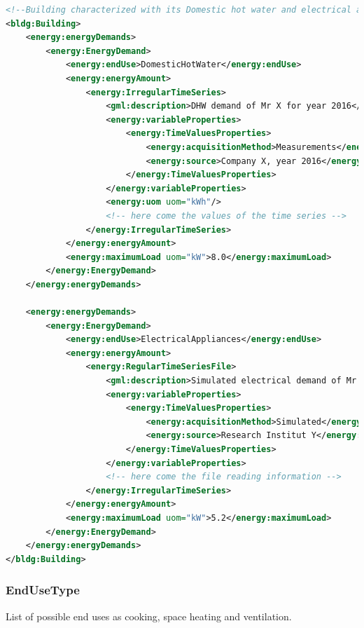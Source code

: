 \documentclass[a4paper,12pt]{article}
\begin{document}
\begin{lstlisting}[language=XML]
<!--Building characterized with its Domestic hot water and electrical appliances demands-->
<bldg:Building>
    <energy:energyDemands>
        <energy:EnergyDemand>
            <energy:endUse>DomesticHotWater</energy:endUse>
            <energy:energyAmount>
                <energy:IrregularTimeSeries>
                    <gml:description>DHW demand of Mr X for year 2016</gml:description>
                    <energy:variableProperties>
                        <energy:TimeValuesProperties>
                            <energy:acquisitionMethod>Measurements</energy:acquisitionMethod>
                            <energy:source>Company X, year 2016</energy:source>
                        </energy:TimeValuesProperties>
                    </energy:variableProperties>
                    <energy:uom uom="kWh"/>
                    <!-- here come the values of the time series -->
                </energy:IrregularTimeSeries>
            </energy:energyAmount>
            <energy:maximumLoad uom="kW">8.0</energy:maximumLoad>
        </energy:EnergyDemand>
    </energy:energyDemands>
    
    <energy:energyDemands>
        <energy:EnergyDemand>
            <energy:endUse>ElectricalAppliances</energy:endUse>
            <energy:energyAmount>
                <energy:RegularTimeSeriesFile>
                    <gml:description>Simulated electrical demand of Mr X for typical year</gml:description>
                    <energy:variableProperties>
                        <energy:TimeValuesProperties>
                            <energy:acquisitionMethod>Simulated</energy:acquisitionMethod>
                            <energy:source>Research Institut Y</energy:source>
                        </energy:TimeValuesProperties>
                    </energy:variableProperties>
                    <!-- here come the file reading information -->
                </energy:IrregularTimeSeries>
            </energy:energyAmount>
            <energy:maximumLoad uom="kW">5.2</energy:maximumLoad>
        </energy:EnergyDemand>
    </energy:energyDemands>
</bldg:Building>
\end{lstlisting}

\subsubsection{EndUseType}\label{endusetype}

List of possible end uses as cooking, space heating and ventilation.
\end{document}
